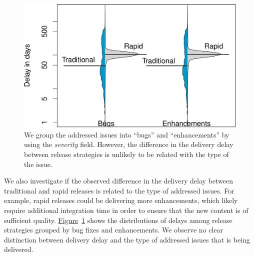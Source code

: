 \begin{figure}[!]
	\centering
	\includegraphics[width=\columnwidth,keepaspectratio]
	{chapters/chapter5/figures/discussion/bugs_vs_enhancements.pdf}
	\caption{We group the addressed issues into ``bugs'' and
	``enhancements'' by using the \textit{severity} field.  However, the
difference in the delivery delay between release strategies is unlikely to be
related with the type of the issue.}
	\label{fig:bugs_vs_enhancements}
\end{figure}

\noindent\DIFdelbegin \textit{\textbf{}%
}%
\DIFdelend \DIFaddbegin {}
\DIFaddend We also investigate if the observed difference in the delivery delay between
traditional and rapid releases is related to the type of addressed issues. For
example, rapid releases could be delivering more enhancements, which likely
require additional integration time in order to ensure that the new content is
of sufficient quality\DIFaddbegin {}\DIFaddend .
\hyperref[fig:bugs_vs_enhancements]{Figure}~\ref{fig:bugs_vs_enhancements} shows
the distributions of delays among release strategies grouped by bug fixes and
enhancements. We observe no clear distinction between delivery delay and the
type of addressed issues that is being delivered.

